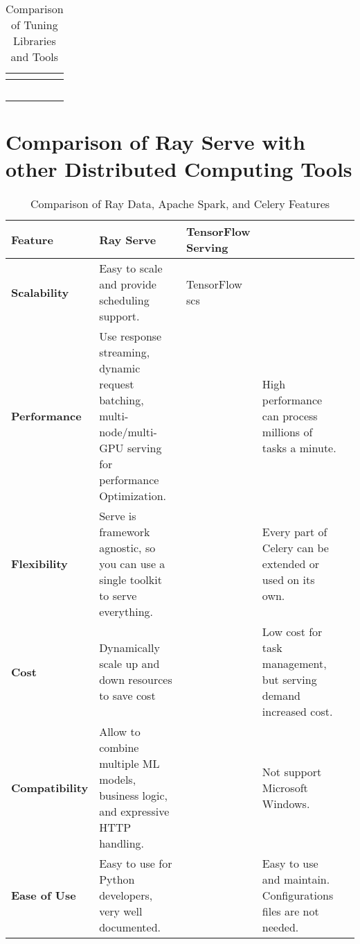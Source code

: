 \begin{table}[ht]
\centering
\begin{tabular}{|p{2.5cm}|p{2.8cm}|p{2.8cm}|p{2.8cm}|p{2.8cm}|}
\hline
\textbf{} & & & & \\
\hline
\textbf{} & & & & \\
\hline
\textbf{} & & & & \\
\hline
\textbf{} & & & & \\
\hline
\textbf{} & & & & \\
\hline
\textbf{} & & & & \\
\hline

\hline
\end{tabular}
\caption{Comparison of Tuning Libraries and Tools}
\label{tab:tuning_libraries_comparison}
\end{table}



\section{Comparison of Ray Serve with other Distributed Computing Tools}


\begin{table}[ht]
\centering
\begin{tabular}{|p{2.5cm}|p{2.8cm}|p{2.8cm}|p{2.8cm}|p{2.8cm}|}
\hline
\textbf{Feature} & \textbf{Ray Serve}  & \textbf{TensorFlow Serving}  \\
\hline
\textbf{Scalability} & Easy to scale and provide scheduling support. \cite{ray_documentation} & TensorFlow scs  \\
\hline
\textbf{Performance} & Use response streaming, dynamic request batching, multi-node/multi-GPU serving for performance Optimization. \cite{ray_documentation} & & High performance can process millions of tasks a minute. \cite{celery_docs} \\
\hline
\textbf{Flexibility} & Serve is framework agnostic, so you can use a single toolkit to serve everything. \cite{ray_documentation} & &  Every part of Celery can be extended or used on its own. \cite{celery_docs} \\
\hline
\textbf{Cost} & Dynamically scale up and down resources to save cost \cite{ray_documentation}  & & Low cost for task management, but serving demand increased cost. \cite{celery_docs}  \\
\hline
\textbf{Compatibility} & Allow to combine multiple ML models, business logic, and expressive HTTP handling. \cite{ray_documentation} & & Not support Microsoft Windows. \cite{celery_docs}  \\
\hline
\textbf{Ease of Use} & Easy to use for Python developers, very well documented. & & Easy to use and maintain. Configurations files are not needed. \cite{celery_docs} \\
\hline

\hline
\end{tabular}
\caption{Comparison of Ray Data, Apache Spark, and Celery Features}
\label{tab:table5}
\end{table}




